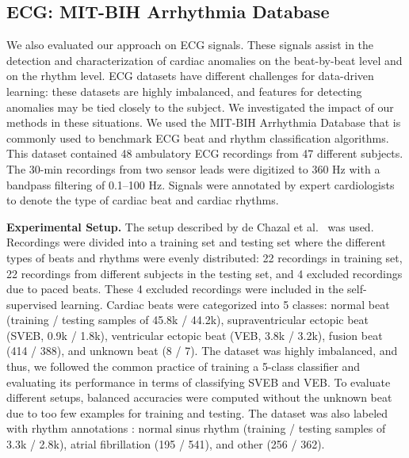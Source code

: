 \documentclass{article}
\renewcommand{\paragraph}[1]{\textbf{#1}\hspace{1em}}
\begin{document}
  \subsection{ECG: MIT-BIH Arrhythmia Database}

We also evaluated our approach on ECG signals. These signals assist in the
detection and characterization of cardiac anomalies on the beat-by-beat level
and on the rhythm level. ECG datasets have different challenges for data-driven
learning: these datasets are highly imbalanced, and features for detecting
anomalies may be tied closely to the subject. We investigated the impact of our
methods in these situations. We used the MIT-BIH Arrhythmia Database
\cite{goldberger_physiobank_2000, moody_impact_2001,physionet_ecg_url} that is
commonly used to benchmark ECG beat and rhythm classification algorithms. This
dataset contained 48 ambulatory ECG recordings from 47 different subjects. The
30-min recordings from two sensor leads were digitized to 360 Hz with a bandpass
filtering of 0.1--100 Hz. Signals were annotated by expert cardiologists to
denote the type of cardiac beat and cardiac rhythms.


\paragraph{Experimental Setup.}
The setup described by de Chazal et al.~\cite{de_chazal_automatic_2004} was
used. Recordings were divided into a training set and testing set where the
different types of beats and rhythms were evenly distributed: 22 recordings in
training set, 22 recordings from different subjects in the testing set, and 4
excluded recordings due to paced beats. These 4 excluded recordings were
included in the self-supervised learning. Cardiac beats were categorized into 5
classes: normal beat (training / testing samples of 45.8k / 44.2k),
supraventricular ectopic beat (SVEB, 0.9k / 1.8k), ventricular ectopic beat
(VEB, 3.8k / 3.2k), fusion beat (414 / 388), and unknown beat (8 / 7). The
dataset was highly imbalanced, and thus, we followed the common practice of
training a 5-class classifier and evaluating its performance in terms of
classifying SVEB and VEB. To evaluate different setups, balanced accuracies were
computed without the unknown beat due to too few examples for training and
testing. The dataset was also labeled with rhythm annotations
\cite{dash_automatic_2009,bruun_automatic_2017,wu_deep_2019}: normal sinus
rhythm (training / testing samples of 3.3k / 2.8k), atrial fibrillation (195 /
541), and other (256 / 362).
\end{document}
